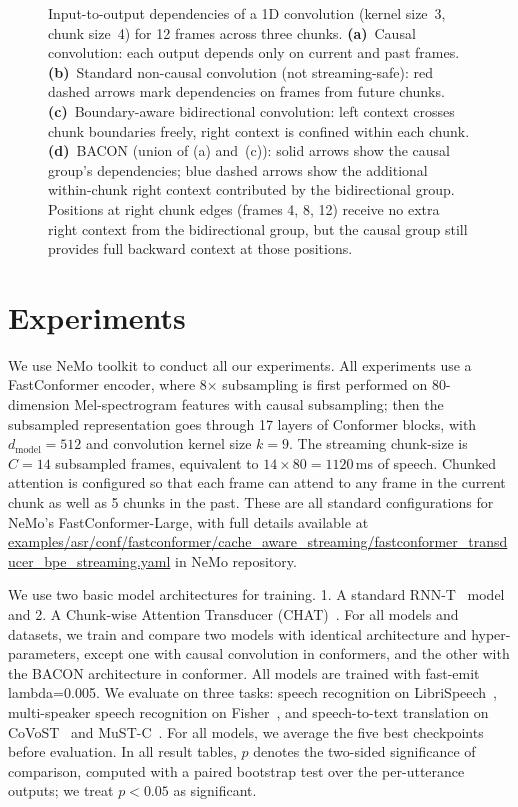 \documentclass[cameraready]{Interspeech}
\begin{document}
\begin{figure}[t]
\caption{Input-to-output dependencies of a 1D convolution (kernel size~3,
chunk size~4) for 12 frames across three chunks.
\textbf{(a)}~Causal convolution: each output depends only on current and past
frames.
\textbf{(b)}~Standard non-causal convolution (not streaming-safe): \textcolor{red!65}{red dashed} arrows
mark dependencies on frames from future chunks.
\textbf{(c)}~Boundary-aware bidirectional convolution: left context crosses
chunk boundaries freely, right context is confined within each chunk.
\textbf{(d)}~BACON (union of (a) and~(c)): solid arrows show the causal
group's dependencies; \textcolor{blue!55}{blue dashed} arrows show the additional
within-chunk right context contributed by the bidirectional group.
Positions at right chunk edges (frames 4, 8, 12) receive no extra right
context from the bidirectional group, but the causal group still provides
full backward context at those positions.}
\label{fig:chunk_conv_deps}
\end{figure}

\section{Experiments}
\label{sec:experiments}

We use NeMo \cite{kuchaiev2019nemo} toolkit to conduct all our experiments. 
All experiments use a FastConformer encoder, where 8$\times$ subsampling is first performed on 80-dimension Mel-spectrogram features with causal subsampling; then the subsampled representation goes through 17 layers of Conformer blocks, with $d_{\text{model}}{=}512$ and convolution kernel size $k{=}9$. The streaming chunk-size is $C{=}14$ subsampled frames, equivalent to $14 \times 80 = 1120$\,ms of speech. Chunked attention is configured so that each frame can attend to any frame in the current chunk as well as 5 chunks in the past. These are all standard configurations for NeMo's FastConformer-Large, with full details available at \url{examples/asr/conf/fastconformer/cache_aware_streaming/fastconformer_transducer_bpe_streaming.yaml} in NeMo repository.

We use two basic model architectures for training. 1. A standard RNN-T~\cite{graves2012sequence} model and 2. A Chunk-wise Attention Transducer (CHAT)~\cite{xu2026chunk}. 
For all models and datasets, we train and compare two models with identical architecture and hyper-parameters, except one with causal convolution in conformers, and the other with the BACON architecture in conformer. 
All models are trained with fast-emit lambda=0.005.
We evaluate on three tasks: speech recognition on LibriSpeech~\cite{panayotov2015librispeech}, multi-speaker speech
recognition on Fisher~\cite{cieri2004fisher},
and speech-to-text translation on CoVoST~\cite{wang2021covost2} and MuST-C~\cite{di-gangi-etal-2019-must}. For all models, we average the five best checkpoints before evaluation.
In all result tables, $p$ denotes the two-sided significance of comparison, computed with a paired bootstrap test over the per-utterance outputs; we treat $p<0.05$ as significant.
\end{document}

